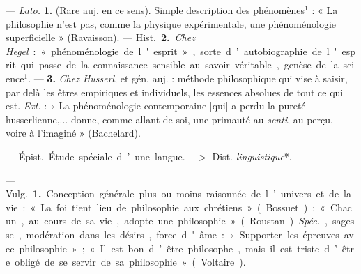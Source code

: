 \begin{itemize}[leftmargin=1cm, label=, itemsep=1pt]
 — {\it Lato.} {\bf 1.} (Rare auj. en ce sens). Simple
description des phénomènes$^1$ : « La philosophie n’est pas, comme la
physique expérimentale,
une phénoménologie superficielle » (Ravaisson). — \si{Hist.}  {\bf 2.}
{\it Chez Hegel} : « phénoménologie de l'esprit », sorte d’autobiographie de
l'esprit qui passe de la connaissance sensible au savoir véritable, genèse de
la science$^1$. — {\bf 3.} {\it Chez Husserl}, et gén. auj. : méthode
philosophique qui vise à saisir, par delà les êtres empiriques et
individuels, les essences absolues de tout ce qui est. {\it Ext.} : « La
phénoménologie contemporaine [qui] a perdu la pureté husserlienne,... donne,
comme allant de soi, une primauté au {\it senti}, au perçu, voire à l’imaginé
» (Bachelard).

 — \si{Épist.} Étude spéciale d’une
langue. $->$ Dist. {\it linguistique}*.

 — \si{Vulg.} {\bf 1.} Conception générale plus ou moins
raisonnée de l’univers et de la vie : « La foi tient lieu de philosophie aux
chrétiens » (Bossuet) ; « Chacun, au cours de sa vie, adopte une philosophie
» (Roustan). {\it Spéc.}, sagesse, modération dans les désirs, force d'âme :
« Supporter les épreuves avec philosophie »; « Il est bon d’être philosophe,
mais il est triste d’être obligé de se servir de sa philosophie » (Voltaire).


\end{itemize}
